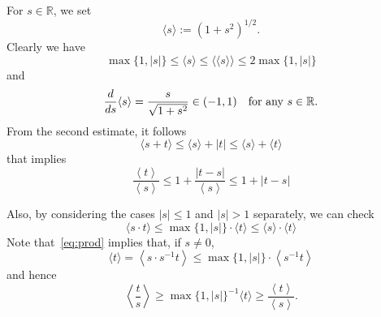 \documentclass[10pt]{amsart}
\theoremstyle{definition}\newtheorem{defi}[theo]{Definition}\newtheorem{rema}[theo]{Remark}\newtheorem{exam}[theo]{Example}\newtheorem{exem}[theo]{Example}\newtheorem{nota}[theo]{Notation}
\newcommand{\bbR}{\mathbb{R}}
\begin{document}
For $s\in\bbR$, we set
\[
\langle s\rangle:=(1+s^{2})^{1/2}.
\]
Clearly we have
\[
\max\{1,|s|\}\le\langle s\rangle\le\langle\langle s\rangle\rangle\le2\max\{1,|s|\}
\]
and
\[
\frac{d}{ds}\langle s\rangle=\frac{s}{\sqrt{1+s^{2}}}\in(-1,1)\quad\text{for any \ensuremath{s\in\bbR}.}
\]
From the second estimate, it follows
\begin{equation}\label{eq:sum}
\langle s+t\rangle\le\langle s\rangle+|t|\le\langle s\rangle+\langle t\rangle
\end{equation}
that implies
\begin{equation}\label{eq:D1p}
\frac{\left\langle t\right\rangle }{\left\langle s\right\rangle }\leq1+\frac{\left|t-s\right|}{\left\langle s\right\rangle }\leq1+\left|t-s\right|
\end{equation}

Also, by considering the cases $|s|\le1$ and $|s|>1$ separately, we can check
\begin{equation}\label{eq:prod}
\langle s\cdot t\rangle\le\max\{1,|s|\}\cdot\langle t\rangle\le\langle s\rangle\cdot\langle t\rangle
\end{equation}
Note that~\eqref{eq:prod} implies that, if $s\neq0$,
\[
\langle t\rangle=\left\langle s\cdot s^{-1}t\right\rangle\le\max\{1,|s|\}\cdot\left\langle s^{-1}t\right\rangle
\]
and hence
\begin{equation}\label{eq:prod2}
\left\langle\frac{t}{s}\right\rangle\ge\max\{1,|s|\}^{-1}\langle t\rangle\ge\frac{\left\langle t\right\rangle }{\left\langle s\right\rangle}.
\end{equation}
\end{document}

